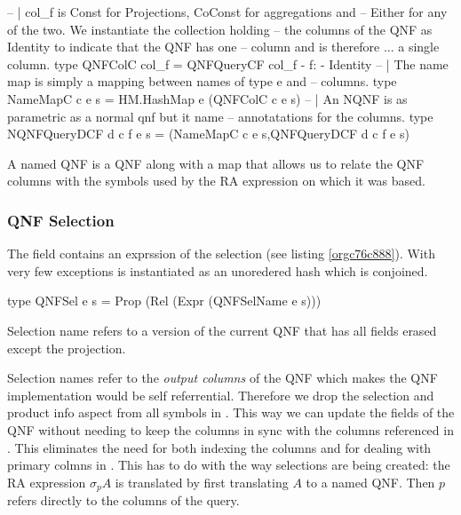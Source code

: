 \begin{code}
  \begin{haskellcode}
    -- | col_f is Const for Projections, CoConst for aggregations and
    -- Either for any of the two. We instantiate the collection holding
    -- the columns of the QNF as Identity to indicate that the QNF has one
    -- column and is therefore ... a single column.
    type QNFColC col_f = QNFQueryCF col_f {- f: -} Identity
    -- | The name map is simply a mapping between names of type e and
    -- columns.
    type NameMapC c e s = HM.HashMap e (QNFColC c e s)
    -- | An NQNF is as parametric as a normal qnf but it name
    -- annotatations for the columns.
    type NQNFQueryDCF d c f e s = (NameMapC c e s,QNFQueryDCF d c f e s)
  \end{haskellcode}
  \caption{\label{org68b5d7d}A named QNF is a QNF along with a map that allows us to relate the QNF columns with the symbols used by the RA expression on which it was based.}
\end{code}


\subsubsection{QNF Selection}
\label{sec:org4074deb}
The  field contains an exprssion of the
selection (see listing \ref{orgc76c888}). With very few exceptions 
is instantiated as an unoredered hash which is conjoined.

\begin{code}
  \begin{haskellcode}
    type QNFSel e s = Prop (Rel (Expr (QNFSelName e s)))
  \end{haskellcode}
  \caption{\label{orgc76c888}Selection name refers to a version of the current QNF that has all fields erased except the projection.}
\end{code}

Selection names refer to the \emph{output columns} of the QNF which makes
the QNF implementation would be self referrential. Therefore we drop
the selection and product info aspect from all symbols in
. This way we can update the fields of the QNF without needing
to keep the columns in sync with the columns referenced in
. This eliminates the need for both indexing the columns and
for dealing with primary colmns in . This has to do with
the way selections are being created: the RA expression \(\sigma_p A\)
is translated by first translating \(A\) to a named QNF. Then \(p\)
refers directly to the columns of the query.

